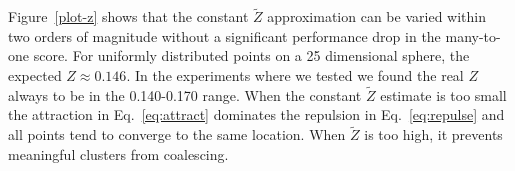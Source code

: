 Figure~\ref{plot-z} shows that the constant $\tilde{Z}$ approximation
can be varied within two orders of magnitude without a significant
performance drop in the many-to-one score.  For uniformly distributed
points on a 25 dimensional sphere, the expected $Z\approx 0.146$.  In
the experiments where we tested we found the real $Z$ always to be in
the 0.140-0.170 range.  When the constant $\tilde{Z}$ estimate is too
small the attraction in Eq.~\ref{eq:attract} dominates the repulsion
in Eq.~\ref{eq:repulse} and all points tend to converge to the same
location.  When $\tilde{Z}$ is too high, it prevents meaningful
clusters from coalescing.







